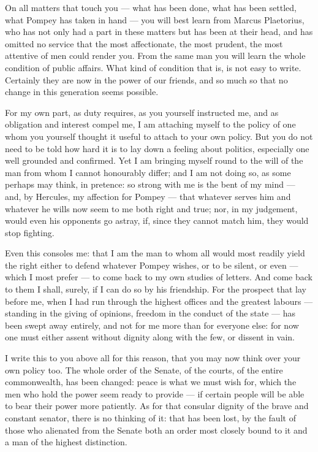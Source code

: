 

 On all matters that touch you --- what has been done, what has been settled, what Pompey has taken in hand --- you will best learn from Marcus Plaetorius, who has not only had a part in these matters but has been at their head, and has omitted no service that the most affectionate, the most prudent, the most attentive of men could render you. From the same man you will learn the whole condition of public affairs. What kind of condition that is, is not easy to write. Certainly they are now in the power of our friends, and so much so that no change in this generation seems possible.

 For my own part, as duty requires, as you yourself instructed me, and as obligation and interest compel me, I am attaching myself to the policy of one whom you yourself thought it useful to attach to your own policy. But you do not need to be told how hard it is to lay down a feeling about politics, especially one well grounded and confirmed. Yet I am bringing myself round to the will of the man from whom I cannot honourably differ; and I am not doing so, as some perhaps may think, in pretence: so strong with me is the bent of my mind --- and, by Hercules, my affection for Pompey --- that whatever serves him and whatever he wills now seem to me both right and true; nor, in my judgement, would even his opponents go astray, if, since they cannot match him, they would stop fighting.

 Even this consoles me: that I am the man to whom all would most readily yield the right either to defend whatever Pompey wishes, or to be silent, or even --- which I most prefer --- to come back to my own studies of letters. And come back to them I shall, surely, if I can do so by his friendship. For the prospect that lay before me, when I had run through the highest offices and the greatest labours --- standing in the giving of opinions, freedom in the conduct of the state --- has been swept away entirely, and not for me more than for everyone else: for now one must either assent without dignity along with the few, or dissent in vain.

 I write this to you above all for this reason, that you may now think over your own policy too. The whole order of the Senate, of the courts, of the entire commonwealth, has been changed: peace is what we must wish for, which the men who hold the power seem ready to provide --- if certain people will be able to bear their power more patiently. As for that consular dignity of the brave and constant senator, there is no thinking of it: that has been lost, by the fault of those who alienated from the Senate both an order most closely bound to it and a man of the highest distinction.

